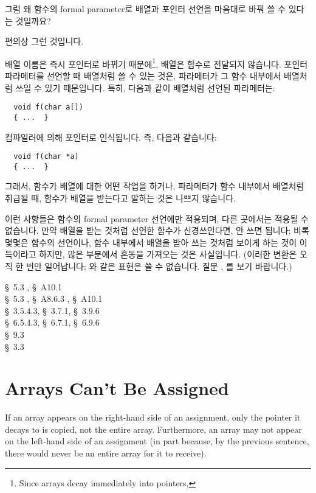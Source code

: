\begin{faq}
	그럼 왜 함수의 formal parameter로 배열과 포인터 선언을
	마음대로 바꿔 쓸 수 있다는 것일까요?

\A
	편의상 그런 것입니다.

	배열 이름은 즉시 포인터로 바뀌기
	때문에\footnote{Since arrays decay immediately into pointers,}, 배열은
	함수로 전달되지 않습니다.  포인터 파라메터를 선언할 때 배열처럼
	쓸 수 있는 것은, 파라메터가 그 함수 내부에서 배열처럼 쓰일 수
	있기 때문입니다.  특히, 다음과 같이 배열처럼 선언된 파라메터는:
\begin{verbatim}
  void f(char a[])
  { ...  }
\end{verbatim}
	컴파일러에 의해 포인터로 인식됩니다.  즉, 다음과 같습니다:
\begin{verbatim}
  void f(char *a)
  { ...  }
\end{verbatim}
	그래서, 함수가 배열에 대한 어떤 작업을 하거나, 파라메터가 함수 내부에서
	배열처럼 취급될 때, 함수가 배열을 받는다고 말하는 것은 나쁘지 않습니다.

	이런 사항들은 함수의 formal parameter 선언에만 적용되며, 다른 곳에서는
	적용될 수 없습니다. 만약 배열을 받는 것처럼 선언한 함수가 신경쓰인다면,
	안 쓰면 됩니다; 비록 몇몇은 함수의 선언이나, 함수 내부에서 배열을 받아
	쓰는 것처럼 보이게 하는 것이 이득이라고 하지만, 많은 부분에서 혼동을
	가져오는 것은 사실입니다. (이러한 변환은 오직 한 번만 일어납니다;
	와 같은 표현은 쓸 수 없습니다. 질문 , 를 보기
	바랍니다.)

\R
	\cite{kr1} \S\ 5.3 , \S\ A10.1  \\
	\cite{kr2} \S\ 5.3 , \S\ A8.6.3 ,
                   \S\ A10.1  \\
	\cite{ansi} \S\ 3.5.4.3, \S\ 3.7.1, \S\ 3.9.6 \\	   
	\cite{c89} \S\ 6.5.4.3, \S\ 6.7.1, \S\ 6.9.6 \\
	\cite{hs} \S\ 9.3  \\
	\cite{ctp} \S\ 3.3 
\end{faq}

\section{Arrays Can't Be Assigned}
If an array appears on the right-hand side of an assignment, only the pointer
it decays to is copied, not the entire array. Furthermore, an array may not
appear on the left-hand side of an assignment (in part because, by the
previous sentence, there would never be an entire array for it to receive).

